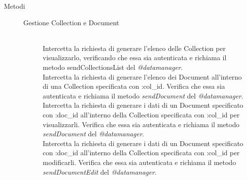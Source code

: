\begin{description}
 
 
 \item[Metodi] \hfill
 \begin{description}
 \item[Gestione Collection e Document]
 \begin{mldescription}
   \hfill \\
  Intercetta la richiesta di generare l'elenco delle Collection per visualizzarlo, verificando che essa sia autenticata e richiama il metodo sendCollectionsList del \textit{@datamanager}.
  \hfill \\   Intercetta la richiesta di generare l'elenco dei Document all'interno di una Collection specificata con :col\_id. Verifica che essa sia autenticata e richiama il metodo \textit{sendDocument} del \textit{@datamanager}.
   \hfill \\
  Intercetta la richiesta di generare i dati di un Document specificato con :doc\_id all'interno della Collection specificata con :col\_id per visualizzarli. Verifica che essa sia autenticata e richiama il metodo \textit{sendDocument} del \textit{@datamanager}.
   \hfill \\
   Intercetta la richiesta di generare i dati di un Document specificato con :doc\_id all'interno della Collection specificata con :col\_id per modificarli. Verifica che essa sia autenticata e richiama il metodo \textit{sendDocumentEdit} del \textit{@datamanager}.
   \hfill \\

\end{mldescription}
\end{description}
\end{description}
